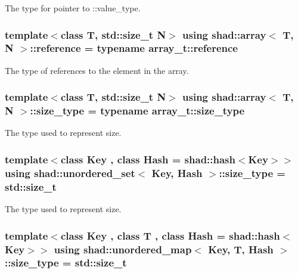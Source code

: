 The type for pointer to \-::value\-\_\-type. 

\hypertarget{group__Types_gad3f7e8f8130d2cfb3b554c72f9f29c57}{
\subsubsection[{reference}]{\setlength{\rightskip}{0pt plus 5cm}template$<$class T, std\-::size\-\_\-t N$>$ using {\bf shad\-::array}$<$ T, N $>$\-::reference =  typename array\-\_\-t\-::reference}}\label{group__Types_gad3f7e8f8130d2cfb3b554c72f9f29c57}


The type of references to the element in the array. 

\hypertarget{group__Types_ga037c76c91958f47f53bfebad4d67f8bb}{
\subsubsection[{size\-\_\-type}]{\setlength{\rightskip}{0pt plus 5cm}template$<$class T, std\-::size\-\_\-t N$>$ using {\bf shad\-::array}$<$ T, N $>$\-::size\-\_\-type =  typename array\-\_\-t\-::size\-\_\-type}}\label{group__Types_ga037c76c91958f47f53bfebad4d67f8bb}


The type used to represent size. 

\hypertarget{group__Types_gaf733341726e3097cf440257afa76d76a}{
\subsubsection[{size\-\_\-type}]{\setlength{\rightskip}{0pt plus 5cm}template$<$class Key , class Hash  = shad\-::hash$<$\-Key$>$$>$ using {\bf shad\-::unordered\-\_\-set}$<$ Key, Hash $>$\-::size\-\_\-type =  std\-::size\-\_\-t}}\label{group__Types_gaf733341726e3097cf440257afa76d76a}


The type used to represent size. 

\hypertarget{group__Types_ga2a84980e6d435a8a7b1a99f78b828a65}{
\subsubsection[{size\-\_\-type}]{\setlength{\rightskip}{0pt plus 5cm}template$<$class Key , class T , class Hash  = shad\-::hash$<$\-Key$>$$>$ using {\bf shad\-::unordered\-\_\-map}$<$ Key, T, Hash $>$\-::size\-\_\-type =  std\-::size\-\_\-t}}\label{group__Types_ga2a84980e6d435a8a7b1a99f78b828a65}


